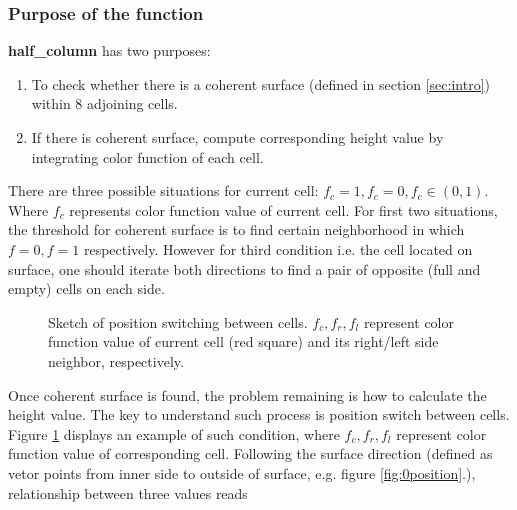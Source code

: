 \documentclass[a4paper]{article}
\newcommand{\func}[1]{\textbf{\textcolor{function}{#1}}}
\begin{document}
\subsubsection{Purpose of the function}\label{sec:purpose}
\func{half\_column} has two purposes:
\begin{enumerate}
    \item To check whether there is a coherent surface (defined in section \ref{sec:intro}) within 8 adjoining cells.
    \item If there is coherent surface, compute corresponding height value by integrating color function of each cell.
\end{enumerate}
There are three possible situations for current cell: $f_c=1,f_c=0,f_c\in(0,1)$. Where $f_c$ represents color function value of current cell. For first two situations, the threshold for coherent surface is to find certain neighborhood in which $f=0,f=1$ respectively. However for third condition i.e. the cell located on surface, one should iterate both directions to find a pair of opposite (full and empty) cells on each side.\par
\begin{figure}
    \centering
    \caption{Sketch of position switching between cells. $f_c,f_r,f_l$ represent color function value of current cell (red square) and its right/left side neighbor, respectively.}
    \label{fig:possw}
\end{figure}
Once coherent surface is found, the problem remaining is how to calculate the height value. The key to understand such process is position switch between cells. Figure \ref{fig:possw} displays an example of such condition, where $f_c,f_r,f_l$ represent color function value of corresponding cell. Following the surface direction (defined as vetor points from inner side to outside of surface, e.g. figure \ref{fig:0position}.), relationship between three values reads
\end{document}
